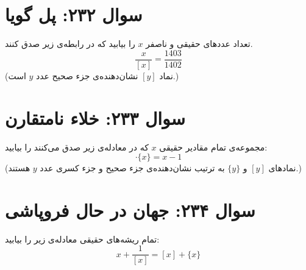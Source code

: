\documentclass[12pt]{article}
\begin{document}
\section*{سوال ۲۳۲: پل گویا}
تعداد عددهای حقیقی و ناصفر \(x\) را بیابید که در رابطه‌ی زیر صدق کنند.
\begin{displaymath}
	\frac{x}{[x]} = \frac{1403}{1402}
\end{displaymath}
(نماد \( [y] \) نشان‌دهنده‌ی جزء صحیح عدد \(y\) است.)

\vspace{1cm}
\hrulefill
\vspace{1cm}

\section*{سوال ۲۳۳: خلاء نامتقارن}
مجموعه‌ی تمام مقادیر حقیقی \(x\) که در معادله‌ی زیر صدق می‌کنند را بیابید:
\begin{displaymath}
	[x] \cdot \{x\} = x - 1
\end{displaymath}
(نمادهای \( [y] \) و \( \{y\} \) به ترتیب نشان‌دهنده‌ی جزء صحیح و جزء کسری عدد \(y\) هستند.)

\vspace{1cm}
\hrulefill
\vspace{1cm}

\section*{سوال ۲۳۴: جهان در حال فروپاشی}
تمام ریشه‌های حقیقی معادله‌ی زیر را بیابید:
\begin{displaymath}
	x + \frac{1}{[x]} = [x] + \{x\}
\end{displaymath}

\vspace{1cm}
\hrulefill
\vspace{1cm}

\end{document}

